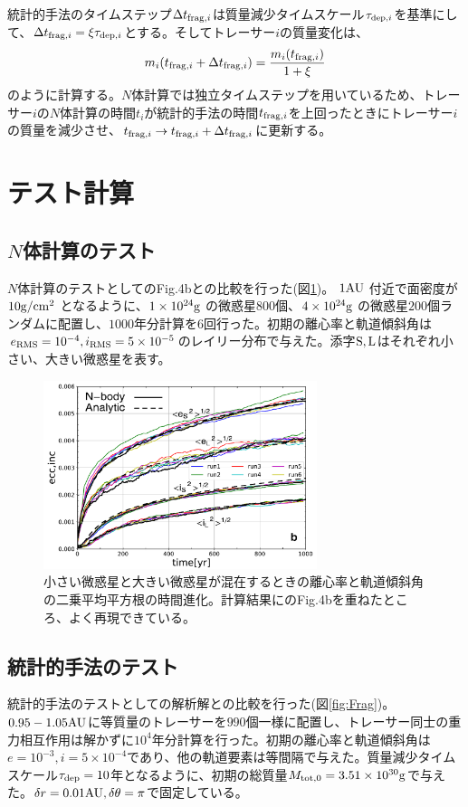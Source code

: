 \documentclass[a4paper,10pt,oneside,twocolumn,notitlepage,final]{jarticle}
\begin{document}
統計的手法のタイムステップ$\Delta t_{{\rm frag},i}$は質量減少タイムスケール$\tau_{{\rm dep},i}$を基準にして、$\Delta t_{{\rm frag},i} = \xi \tau_{{\rm dep},i}$とする。そしてトレーサー$i$の質量変化は、
\begin{align}
 m_i(t_{{\rm frag},i} + \Delta t_{{\rm frag},i}) = \frac{m_i(t_{{\rm frag},i})}{1 + \xi}
\end{align}
のように計算する。$N$体計算では独立タイムステップを用いているため、トレーサー$i$の$N$体計算の時間$t_i$が統計的手法の時間$t_{{\rm frag},i}$を上回ったときにトレーサー$i$の質量を減少させ、$t_{{\rm frag},i} \to t_{{\rm frag},i} + \Delta t_{{\rm frag},i}$に更新する。

\section{テスト計算}
\subsection{$N$体計算のテスト}
$N$体計算のテストとして\cite{Ohtsuki2002}のFig.4bとの比較を行った(図\ref{fig:Nbody})。
$1 {\rm AU}$ 付近で面密度が $10 {\rm g/cm^2}$ となるように、$1 \times 10^{24} {\rm g}$ の微惑星$800$個、$4 \times 10^{24} {\rm g}$ の微惑星$200$個ランダムに配置し、$1000$年分計算を6回行った。初期の離心率と軌道傾斜角は$e_{\rm RMS} = 10^{-4}, i_{\rm RMS} = 5 \times 10^{-5}$のレイリー分布で与えた。添字${\rm S,L}$はそれぞれ小さい、大きい微惑星を表す。

\begin{figure}[h]
 \centering
 \includegraphics[width=8cm]{Ohtsuki_figb_and_Nbodytest_6run.pdf}
 \caption{小さい微惑星と大きい微惑星が混在するときの離心率と軌道傾斜角の二乗平均平方根の時間進化。計算結果に\cite{Ohtsuki2002}のFig.4bを重ねたところ、よく再現できている。\label{fig:Nbody}}
\end{figure}

\subsection{統計的手法のテスト}
統計的手法のテストとして\cite{Kobayashi2010}の解析解との比較を行った(図\ref{fig:Frag})。
$0.95 - 1.05 {\rm AU}$に等質量のトレーサーを$990$個一様に配置し、トレーサー同士の重力相互作用は解かずに$10^4$年分計算を行った。初期の離心率と軌道傾斜角は$e = 10^{-3}, i = 5 \times 10^{-4}$であり、他の軌道要素は等間隔で与えた。質量減少タイムスケール$\tau_{\rm dep}=10$年となるように、初期の総質量$M_{\rm tot,0} = 3.51 \times 10^{30} {\rm g}$で与えた。$\delta r = 0.01 {\rm AU}, \delta \theta = \pi$で固定している。
\end{document}
